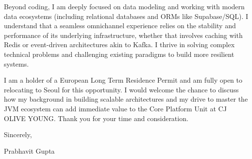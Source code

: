 \documentclass[11pt,a4paper]{article}
\begin{document}
\vspace{1em}
\noindent Beyond coding, I am deeply focused on data modeling and working with modern data ecosystems (including relational databases and ORMs like Supabase/SQL). I understand that a seamless omnichannel experience relies on the stability and performance of its underlying infrastructure, whether that involves caching with Redis or event-driven architectures akin to Kafka. I thrive in solving complex technical problems and challenging existing paradigms to build more resilient systems. 

\vspace{1em}
\noindent I am a holder of a European Long Term Residence Permit and am fully open to relocating to Seoul for this opportunity. I would welcome the chance to discuss how my background in building scalable architectures and my drive to master the JVM ecosystem can add immediate value to the Core Platform Unit at CJ OLIVE YOUNG. Thank you for your time and consideration.

\vspace{2em}

\noindent Sincerely,

\vspace{1em}

\noindent Prabhavit Gupta
\end{document}
